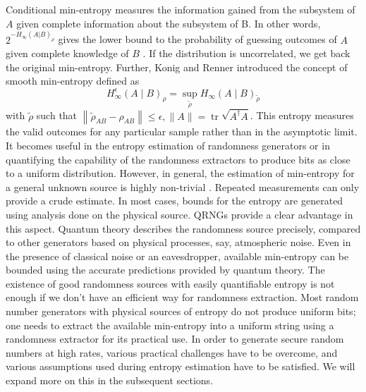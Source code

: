 \documentclass[]{interact}
\theoremstyle{plain}%
\theoremstyle{definition}
\theoremstyle{remark}
\begin{document}
Conditional min-entropy measures the information gained from the subsystem of $A$ given complete information about the subsystem of B. In other words, $2^{-H_\infty(A|B)_\rho}$ gives the lower bound to the probability of guessing outcomes of $A$ given complete knowledge of $B$ \cite{10.1109/TIT.2009.2025545}. If the distribution is uncorrelated, we get back the original min-entropy. Further, Konig and Renner \cite{5895072} introduced the concept of smooth min-entropy defined as
$$
H_{\infty}^{\epsilon}(A \mid B)_{\rho}=\sup _{\tilde{\rho}} H_{\infty}(A \mid B)_{\tilde{\rho}}
$$
with $\tilde{\rho}$ such that $\left\|\tilde{\rho}_{A B}-\rho_{A B}\right\| \leq \epsilon,\|A\|=\operatorname{tr} \sqrt{A^{\dagger} A}$. This entropy measures the valid outcomes for any particular sample rather than in the asymptotic limit. It becomes useful in the entropy estimation of randomness generators or in quantifying the capability of the randomness extractors to produce bits as close to a uniform distribution. However, in general, the estimation of min-entropy for a general unknown source is highly non-trivial \cite{watson2016complexity,Lyngso2002}. Repeated measurements can only provide a crude estimate. In most cases, bounds for the entropy are generated using analysis done on the physical source. QRNGs provide a clear advantage in this aspect. Quantum theory describes the randomness source precisely, compared to other generators based on physical processes, say, atmospheric noise. Even in the presence of classical noise or an eavesdropper, available min-entropy can be bounded using the accurate predictions provided by quantum theory. The existence of good randomness sources with easily quantifiable entropy is not enough if we don't have an efficient way for randomness extraction. Most random number generators with physical sources of entropy do not produce uniform bits; one needs to extract the available min-entropy into a uniform string using a randomness extractor for its practical use. In order to generate secure random numbers at high rates, various practical challenges have to be overcome, and various assumptions used during entropy estimation have to be satisfied. We will expand more on this in the subsequent sections. 
\end{document}
